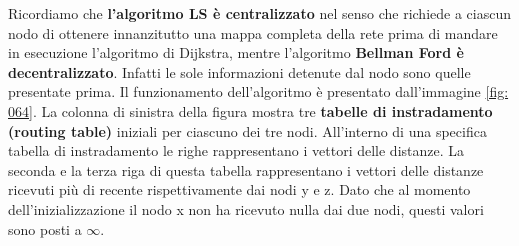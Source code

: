 \documentclass[11pt,a4paper]{article}
\begin{document}
Ricordiamo che \textbf{l'algoritmo LS è centralizzato} nel senso che richiede a ciascun nodo di ottenere innanzitutto una mappa completa della rete prima di mandare in esecuzione l'algoritmo di Dijkstra, mentre l'algoritmo \textbf{Bellman Ford è decentralizzato}. Infatti le sole informazioni detenute dal nodo sono quelle presentate prima. Il funzionamento dell'algoritmo è presentato dall'immagine \ref{fig: 064}. La colonna di sinistra della figura mostra tre \textbf{tabelle di instradamento (routing table)} iniziali per ciascuno dei tre nodi. All'interno di una specifica tabella di instradamento le righe rappresentano i vettori delle distanze. La seconda e la terza riga di questa tabella rappresentano i vettori delle distanze ricevuti più di recente rispettivamente dai nodi y e z. Dato che al  momento dell'inizializzazione il nodo x non ha ricevuto nulla dai due nodi, questi valori sono posti a $\infty$.
\end{document}
